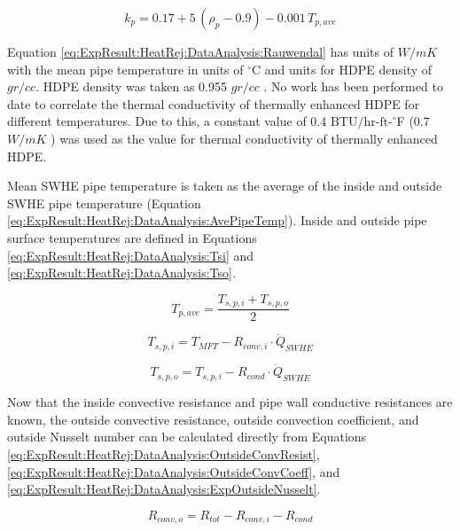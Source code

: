 	\begin{equation}
		k_p=0.17+5 \, (\rho_{p}-0.9)-0.001 \, T_{p,ave}
		\label{eq:ExpResult:HeatRej:DataAnalysis:Rauwendal}
	\end{equation}
	
Equation \ref{eq:ExpResult:HeatRej:DataAnalysis:Rauwendal} has units of $W/mK$ with the mean pipe temperature in units of $^\circ$C and units for HDPE density of $gr/cc$. HDPE density was taken as 0.955 $gr/cc$ \citep{Polypipe2013}. No work has been performed to date to correlate the thermal conductivity of thermally enhanced HDPE for different temperatures. Due to this, a constant value of 0.4 $\mbox{BTU}/\mbox{hr-ft-}^\circ$F (0.7 $W/mK$ \citep{Gonthier2012}) was used as the value for thermal conductivity of thermally enhanced HDPE.

Mean SWHE pipe temperature is taken as the average of the inside and outside SWHE pipe temperature (Equation \ref{eq:ExpResult:HeatRej:DataAnalysis:AvePipeTemp}). Inside and outside pipe surface temperatures are defined in Equations \ref{eq:ExpResult:HeatRej:DataAnalysis:Tsi} and \ref{eq:ExpResult:HeatRej:DataAnalysis:Tso}.
	
	\begin{equation}
		T_{p,ave} = \frac{T_{s,p,i} + T_{s,p,o}}{2}
		\label{eq:ExpResult:HeatRej:DataAnalysis:AvePipeTemp}
	\end{equation}
	
	\begin{equation}
		T_{s,p,i} = T_{MFT} - R_{conv,i} \cdot \dot{Q}_{SWHE}
		\label{eq:ExpResult:HeatRej:DataAnalysis:Tsi}
	\end{equation}
	
	\begin{equation}
		T_{s,p,o} = T_{s,p,i} - R_{cond} \cdot \dot{Q}_{SWHE}
		\label{eq:ExpResult:HeatRej:DataAnalysis:Tso}
	\end{equation}

Now that the inside convective resistance and pipe wall conductive resistances are known, the outside convective resistance, outside convection coefficient, and outside Nusselt number can be calculated directly from Equations \ref{eq:ExpResult:HeatRej:DataAnalysis:OutsideConvResist}, \ref{eq:ExpResult:HeatRej:DataAnalysis:OutsideConvCoeff}, and \ref{eq:ExpResult:HeatRej:DataAnalysis:ExpOutsideNusselt}.  

	\begin{equation}
		R_{conv,o}=R_{tot}-R_{conv,i}-R_{cond}
		\label{eq:ExpResult:HeatRej:DataAnalysis:OutsideConvResist}
	\end{equation}

